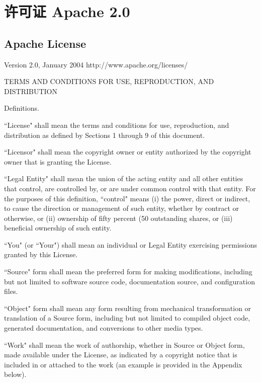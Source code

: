 \section{许可证 Apache 2.0}
\subsection{Apache License}

\begingroup %
\begin{center}
	Version 2.0, January 2004
	http://www.apache.org/licenses/	
\end{center}
\setlength{\parindent}{0pt} %

TERMS AND CONDITIONS FOR USE, REPRODUCTION, AND DISTRIBUTION

\begin{numul}
	\item
	Definitions.
	
	``License" shall mean the terms and conditions for use, reproduction,
	and distribution as defined by Sections 1 through 9 of this document.
	
	``Licensor" shall mean the copyright owner or entity authorized by
	the copyright owner that is granting the License.
	
	``Legal Entity" shall mean the union of the acting entity and all
	other entities that control, are controlled by, or are under common
	control with that entity. For the purposes of this definition,
	``control" means (i) the power, direct or indirect, to cause the
	direction or management of such entity, whether by contract or
	otherwise, or (ii) ownership of fifty percent (50%
	outstanding shares, or (iii) beneficial ownership of such entity.
	
	``You" (or ``Your") shall mean an individual or Legal Entity
	exercising permissions granted by this License.
	
	``Source" form shall mean the preferred form for making modifications,
	including but not limited to software source code, documentation
	source, and configuration files.
	
	``Object" form shall mean any form resulting from mechanical
	transformation or translation of a Source form, including but
	not limited to compiled object code, generated documentation,
	and conversions to other media types.
	
	``Work" shall mean the work of authorship, whether in Source or
	Object form, made available under the License, as indicated by a
	copyright notice that is included in or attached to the work
	(an example is provided in the Appendix below).
	

\end{numul}
